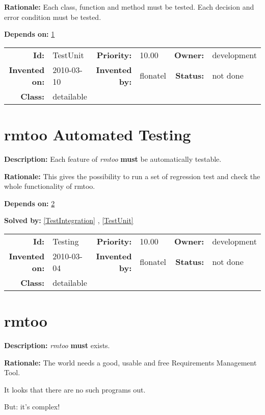 \textbf{Rationale:} Each class, function and method must be tested.  Each
decision and error condition must be tested.

\textbf{Depends on:} \ref{Testing} 

\par
{\small \begin{center}\begin{tabular}{rlrlrl}
\textbf{Id:} & TestUnit  & \textbf{Priority:} & 10.00  & \textbf{Owner:} & development\\ 
\textbf{Invented on:} & 2010-03-10  & \textbf{Invented by:} & flonatel  & \textbf{Status:} & not done \\ 
\textbf{Class:} & detailable  & & & \end{tabular}\end{center} }

\section{rmtoo Automated Testing}\label{Testing}
\textbf{Description:} Each feature of \textsl{rmtoo} \textbf{must} be
automatically testable.

\textbf{Rationale:} This gives the possibility to run a set of regression test
and check the whole functionality of rmtoo.

\textbf{Depends on:} \ref{rmtoo} 

\textbf{Solved by:} \ref{TestIntegration} , \ref{TestUnit} 

\par
{\small \begin{center}\begin{tabular}{rlrlrl}
\textbf{Id:} & Testing  & \textbf{Priority:} & 10.00  & \textbf{Owner:} & development\\ 
\textbf{Invented on:} & 2010-03-04  & \textbf{Invented by:} & flonatel  & \textbf{Status:} & not done \\ 
\textbf{Class:} & detailable  & & & \end{tabular}\end{center} }

\section{rmtoo}\label{rmtoo}
\textbf{Description:} \textsl{rmtoo} \textbf{must} exists.

\textbf{Rationale:} The world needs a good, usable and free Requirements
Management Tool.\par
It looks that there are no such programs out.\par
But: it's complex!


